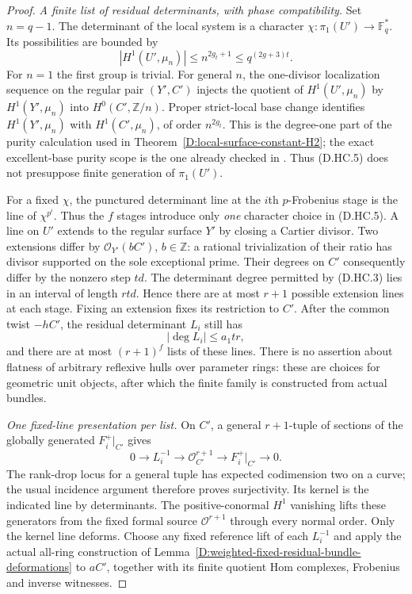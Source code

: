 \begin{proof}
\emph{A finite list of residual determinants, with phase compatibility.}
Set $n=q-1$. The determinant of the local system is a
character $\chi:\pi_1(U')\to\mathbb F_q^*$. Its possibilities
are bounded by
\[
 |H^1(U',\mu_n)|
                 \leq n^{2g_t+1}\leq q^{(2g+3)t}.       \tag{D.HC.5}
\]
For $n=1$ the first group is trivial. For general $n$, the
one-divisor localization sequence on the regular pair
$(Y',C')$ injects the quotient of $H^1(U',\mu_n)$ by
$H^1(Y',\mu_n)$ into $H^0(C',\mathbb Z/n)$.
Proper strict-local base change identifies
$H^1(Y',\mu_n)$ with $H^1(C',\mu_n)$, of order $n^{2g_t}$.
This is the degree-one part of the purity calculation used
in Theorem~\ref{D:local-surface-constant-H2}; the exact
excellent-base purity scope is the one already checked in
\citet[Expose XVI, Theorem 3.1.1 and Corollary 3.1.3]
{A_ILO2014}. Thus (D.HC.5) does not presuppose finite
generation of $\pi_1(U')$.

For a fixed $\chi$, the punctured determinant line at the
$i$th $p$-Frobenius stage is the line of $\chi^{p^i}$.
Thus the $f$ stages introduce only \emph{one} character
choice in (D.HC.5). A line on $U'$ extends to the regular
surface $Y'$ by closing a Cartier divisor. Two extensions
differ by $\mathcal O_{Y'}(bC')$, $b\in\mathbb Z$:
a rational trivialization of their ratio has divisor
supported on the sole exceptional prime. Their degrees
on $C'$ consequently differ by the nonzero step $td$.
The determinant degree permitted by (D.HC.3) lies in an
interval of length $rtd$. Hence there are at most $r+1$
possible extension lines at each stage. Fixing an extension
fixes its restriction to $C'$. After the common twist
$-hC'$, the residual determinant $L_i$ still has
\[
                         |\deg L_i|\leq a_1tr,          \tag{D.HC.6}
\]
and there are at most $(r+1)^f$ lists of these lines.
There is no assertion about flatness of arbitrary reflexive
hulls over parameter rings: these are choices for geometric
unit objects, after which the finite family is constructed
from actual bundles.

\emph{One fixed-line presentation per list.}
On $C'$, a general $r+1$-tuple of sections of the globally
generated $F_i^+|_{C'}$ gives
\[
 0\longrightarrow L_i^{-1}\longrightarrow
 \mathcal O_{C'}^{r+1}\longrightarrow F_i^+|_{C'}
 \longrightarrow0.                                    \tag{D.HC.7}
\]
The rank-drop locus for a general tuple has expected
codimension two on a curve; the usual incidence argument
therefore proves surjectivity. Its kernel is the indicated
line by determinants. The positive-conormal $H^1$
vanishing lifts these generators from the fixed formal
source $\mathcal O^{r+1}$ through every normal order.
Only the kernel line deforms. Choose any fixed reference
lift of each $L_i^{-1}$ and apply the actual all-ring
construction of Lemma~\ref{D:weighted-fixed-residual-bundle-deformations}
to $aC'$, together with its finite quotient Hom complexes,
Frobenius and inverse witnesses.


\end{proof}
